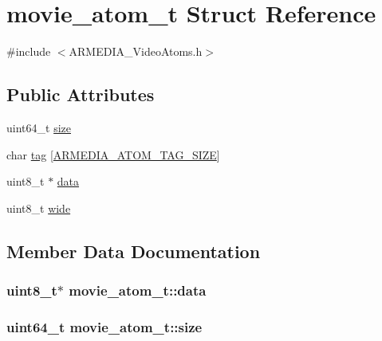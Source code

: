 \hypertarget{structmovie__atom__t}{}\section{movie\+\_\+atom\+\_\+t Struct Reference}
\label{structmovie__atom__t}


{\ttfamily \#include $<$A\+R\+M\+E\+D\+I\+A\+\_\+\+Video\+Atoms.\+h$>$}

\subsection*{Public Attributes}
\begin{DoxyCompactItemize}
\item 
uint64\+\_\+t \hyperlink{structmovie__atom__t_a65990065ac60f20eefdc588e938e8288}{size}
\item 
char \hyperlink{structmovie__atom__t_ad05588847bbd620fb7e82b2ec9b383f8}{tag} \mbox{[}\hyperlink{_a_r_m_e_d_i_a___video_atoms_8h_a019ad4e90f45008eeb6c96e64ceb2cd8}{A\+R\+M\+E\+D\+I\+A\+\_\+\+A\+T\+O\+M\+\_\+\+T\+A\+G\+\_\+\+S\+I\+ZE}\mbox{]}
\item 
uint8\+\_\+t $\ast$ \hyperlink{structmovie__atom__t_a681da6dbfcdda4eef77a092e44ba7db6}{data}
\item 
uint8\+\_\+t \hyperlink{structmovie__atom__t_a61f422b9f75749cf081a74da955df382}{wide}
\end{DoxyCompactItemize}


\subsection{Member Data Documentation}
\subsubsection[{\texorpdfstring{data}{data}}]{\setlength{\rightskip}{0pt plus 5cm}uint8\+\_\+t$\ast$ movie\+\_\+atom\+\_\+t\+::data}\hypertarget{structmovie__atom__t_a681da6dbfcdda4eef77a092e44ba7db6}{}\label{structmovie__atom__t_a681da6dbfcdda4eef77a092e44ba7db6}
\subsubsection[{\texorpdfstring{size}{size}}]{\setlength{\rightskip}{0pt plus 5cm}uint64\+\_\+t movie\+\_\+atom\+\_\+t\+::size}\hypertarget{structmovie__atom__t_a65990065ac60f20eefdc588e938e8288}{}\label{structmovie__atom__t_a65990065ac60f20eefdc588e938e8288}
